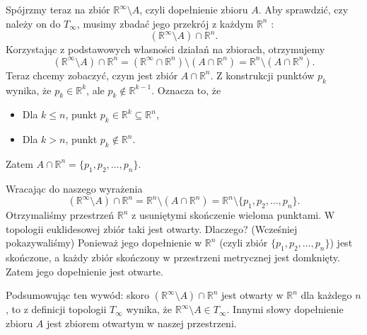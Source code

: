 \begin{eg}[1.2.2.]
Spójrzmy teraz na zbiór $\mathbb{R}^{\infty}\setminus A$, czyli dopełnienie zbioru $A$. Aby sprawdzić, czy należy on do $T_{\infty}$, musimy zbadać jego przekrój z każdym $\mathbb{R}^{n}$ :
\[
	\left( \mathbb{R}^{\infty} \setminus A \right) \cap \mathbb{R}^{n}
.\] 
Korzystając z podstawowych własności działań na zbiorach, otrzymujemy
\[
	\left( \mathbb{R}^{\infty}\setminus A \right) \cap \mathbb{R}^{n} = \left( \mathbb{R}^{\infty} \cap  \mathbb{R}^{n} \right) \setminus \left( A \cap \mathbb{R}^{n} \right) = \mathbb{R}^{n}\setminus \left( A\cap \mathbb{R}^{n} \right) 
.\] 
Teraz chcemy zobaczyć, czym jest zbiór $A\cap \mathbb{R}^{n}$. Z konstrukcji punktów $p_{k}$ wynika, że $p_{k} \in \mathbb{R}^{k}$, ale $p_{k} \not\in \mathbb{R}^{k-1}$. Oznacza to, że
\begin{itemize}
	\item Dla $k\le n$, punkt $p_{k}\in \mathbb{R}^{k}\subseteq \mathbb{R}^{n}$,
	 \item Dla $k>n$, punkt $p_{k} \not\in \mathbb{R}^{n}$.
\end{itemize}
Zatem $A\cap \mathbb{R}^{n} = \{p_1, p_2,\ldots,p_{n} \} $.

Wracając do naszego wyrażenia
\[
	\left( \mathbb{R}^{\infty}\setminus A \right) \cap \mathbb{R}^{n} = \mathbb{R}^{n}\setminus \left( A \cap \mathbb{R}^{n} \right) = \mathbb{R}^{n}\setminus \{p_1,p_2,\ldots,p_{n}\} 
.\] 
Otrzymaliśmy przestrzeń $\mathbb{R}^{n}$ z usuniętymi skończenie wieloma punktami. W topologii euklidesowej zbiór taki jest otwarty. Dlaczego? (Wcześniej pokazywaliśmy) Ponieważ jego dopełnienie w $\mathbb{R}^{n}$ (czyli zbiór $\{p_1,p_2,\ldots,p_{n} \} $) jest skończone, a każdy zbiór skończony w przestrzeni metrycznej jest domknięty. Zatem jego dopełnienie jest otwarte.

Podsumowując ten wywód: skoro $\left( \mathbb{R}^{\infty}\setminus A \right) \cap \mathbb{R}^{n}$ jest otwarty w $\mathbb{R}^{n}$ dla każdego $n$, to z definicji topologii $T_{\infty}$ wynika, że $\mathbb{R}^{\infty}\setminus A \in T_{\infty}$. Innymi słowy dopełnienie zbioru $A$ jest zbiorem otwartym w naszej przestrzeni.


\end{eg}
